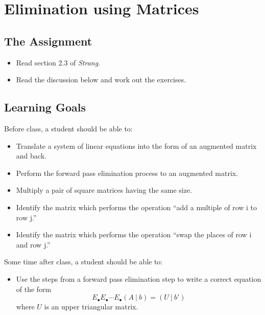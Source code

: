 \documentclass[10pt,]{book}
\theoremstyle{plain}
\theoremstyle{definition}
\numberwithin{equation}{section}
\begin{document}
\section[Elimination using Matrices]{Elimination using Matrices}\label{matrix-elimination}
\typeout{************************************************}
\typeout{************************************************}
\subsection[The Assignment]{The Assignment}\label{subsection-29}
\begin{itemize}
\item{}Read section 2.3 of \emph{Strang}.\item{}Read the discussion below and work out the exercises.\end{itemize}
\typeout{************************************************}
\typeout{************************************************}
\subsection[Learning Goals]{Learning Goals}\label{subsection-30}

        Before class, a student should be able to:
\begin{itemize}
\item{}
          Translate a system of linear equations into the form of an augmented matrix
          and back.
        \item{}
          Perform the forward pass elimination process to an augmented matrix.
        \item{}
          Multiply a pair of square matrices having the same size.
        \item{}
          Identify the matrix which performs the operation ``add a multiple of row
          i to row j.''
        \item{}Identify the matrix which performs the operation ``swap the places of
          row i and row j.''
        \end{itemize}
\par

        Some time after class, a student should be able to:
\begin{itemize}
\item{}
          Use the steps from a forward pass elimination step to write a correct
          equation of the form
          \[
            E_{\bullet}E_{\bullet}\cdots E_{\bullet} (A\ |\ b) = (U\ |\ b')
          \]
          where \(U\) is an upper triangular matrix.
        \end{itemize}
\typeout{************************************************}
\typeout{************************************************}
\end{document}
